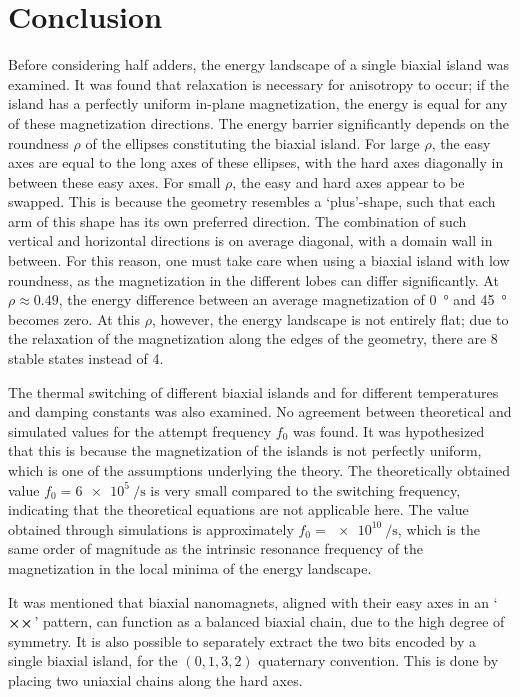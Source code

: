 \documentclass[twocolumn]{phdsymp}
\begin{document}
\section{Conclusion}
Before considering half adders, the energy landscape of a single biaxial island was examined. It was found that relaxation is necessary for anisotropy to occur; if the island has a perfectly uniform in-plane magnetization, the energy is equal for any of these magnetization directions. The energy barrier significantly depends on the roundness $\rho$ of the ellipses constituting the biaxial island. For large $\rho$, the easy axes are equal to the long axes of these ellipses, with the hard axes diagonally in between these easy axes. For small $\rho$, the easy and hard axes appear to be swapped. This is because the geometry resembles a `plus'-shape, such that each arm of this shape has its own preferred direction. The combination of such vertical and horizontal directions is on average diagonal, with a domain wall in between. For this reason, one must take care when using a biaxial island with low roundness, as the magnetization in the different lobes can differ significantly. At $\rho \approx 0.49$, the energy difference between an average magnetization of \SI{0}{\degree} and \SI{45}{\degree} becomes zero. At this $\rho$, however, the energy landscape is not entirely flat; due to the relaxation of the magnetization along the edges of the geometry, there are 8 stable states instead of 4. \par
The thermal switching of different biaxial islands and for different temperatures and damping constants was also examined. No agreement between theoretical and simulated values for the attempt frequency $f_0$ was found. It was hypothesized that this is because the magnetization of the islands is not perfectly uniform, which is one of the assumptions underlying the theory. The theoretically obtained value $f_0=\SI{6e5}{\per\second}$ is very small compared to the switching frequency, indicating that the theoretical equations are not applicable here. The value obtained through simulations is approximately $f_0=\SI{e10}{\per\second}$,  which is the same order of magnitude as the intrinsic resonance frequency of the magnetization in the local minima of the energy landscape. \par
It was mentioned that biaxial nanomagnets, aligned with their easy axes in an `$\cross \cross$' pattern, can function as a balanced biaxial chain, due to the high degree of symmetry. It is also possible to separately extract the two bits encoded by a single biaxial island, for the $(0,1,3,2)$ quaternary convention. This is done by placing two uniaxial chains along the hard axes. \par
\end{document}
